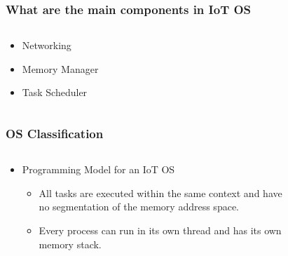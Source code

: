 \documentclass{beamer}
\begin{document}
\begin{frame}
	\frametitle{What are the main components in IoT OS}
	\begin{columns}[c]
		\begin{column}{30cm}
			\vspace{.1cm}
			\begin{itemize}
				\justifying
				\item Networking
				\item Memory Manager
				\item Task Scheduler
			\end{itemize}
		\end{column}
	\end{columns}
\end{frame}

\begin{frame}
	\frametitle{OS Classification}
	\begin{columns}[c]
		\begin{column}{30cm}
			\vspace{.1cm}
			\begin{itemize}
				\justifying
				\item Programming Model for an IoT OS
				\begin{itemize}
					\item All tasks are executed within the same context and have\\
					no segmentation of the memory address space.
					\item Every process can run in its own thread and has its own\\
					memory stack.
				\end{itemize}
			\end{itemize}
		\end{column}
	\end{columns}
\end{frame}
\end{document}
